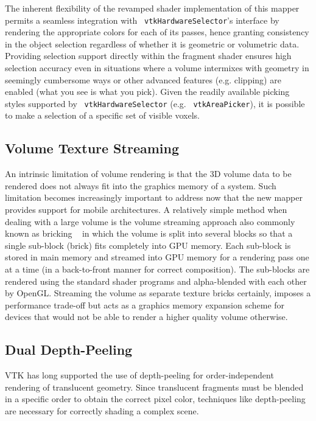 The inherent flexibility of the revamped shader implementation of this mapper
permits a seamless integration with ~\texttt{vtkHardwareSelector}'s interface by
rendering the appropriate colors for each of its passes, hence granting
consistency in the object selection regardless of whether it is geometric or
volumetric data.  Providing selection support directly within the fragment
shader ensures high selection accuracy even in situations where a volume
intermixes with geometry in seemingly cumbersome ways or other advanced features
(e.g. clipping) are enabled (what you see is what you pick).  Given the readily
available picking styles supported by ~\texttt{vtkHardwareSelector} (e.g.
~\texttt{vtkAreaPicker}), it is possible to make a selection of a specific set
of visible voxels.

\subsection{Volume Texture Streaming} An intrinsic limitation of volume
rendering is that the 3D volume data to be rendered does not always fit into the
graphics memory of a system. Such limitation becomes increasingly important to
address now that the new mapper provides support for mobile architectures.  A
relatively simple method when dealing with a large volume is the volume
streaming approach also commonly known as bricking ~\citep{engel_real-time_2006}
in which the volume is split into several blocks so that a single sub-block (brick)
fits completely into GPU memory.  Each sub-block is stored in main memory and streamed
into GPU memory for a rendering pass one at a time (in a back-to-front manner for correct
composition). The sub-blocks are rendered using the standard shader programs and
alpha-blended with each other by OpenGL. Streaming the volume as separate
texture bricks certainly, imposes a performance trade-off but acts as a graphics
memory expansion scheme for devices that would not be able to render a higher
quality volume otherwise.

\subsection{Dual Depth-Peeling} VTK has long supported the use of depth-peeling
for order-independent rendering of translucent geometry. Since translucent
fragments must be blended in a specific order to obtain the correct pixel color,
techniques like depth-peeling are necessary for correctly shading a complex
scene.

